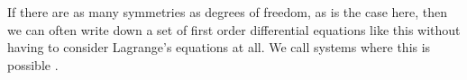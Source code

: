 \documentclass[fleqn]{NotesClass}
\begin{document}
    If there are as many symmetries as degrees of freedom, as is the case here, then we can often write down a set of first order differential equations like this without having to consider Lagrange's equations at all.
    We call systems where this is possible .
    
%        
    
    \backmatter
    \renewcommand{\glossaryname}{Acronyms}
    \printglossary[acronym]
    \printindex
\end{document}
